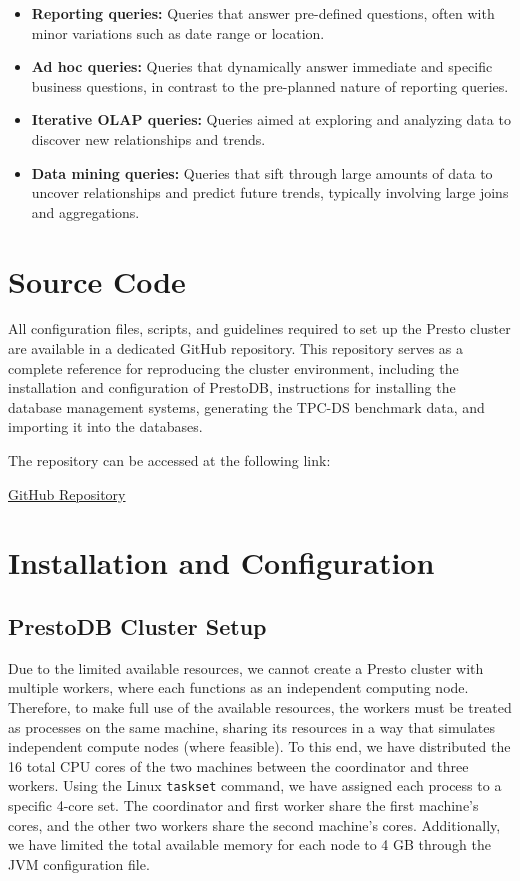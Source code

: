 \documentclass[conference]{IEEEtran}
\begin{document}
\begin{itemize}
    \item \textbf{Reporting queries:} Queries that answer pre-defined questions, often with minor variations such as date range or location.
    \item \textbf{Ad hoc queries:} Queries that dynamically answer immediate and specific business questions, in contrast to the pre-planned nature of reporting queries.
    \item \textbf{Iterative OLAP queries:} Queries aimed at exploring and analyzing data to discover new relationships and trends.
    \item \textbf{Data mining queries:} Queries that sift through large amounts of data to uncover relationships and predict future trends, typically involving large joins and aggregations. \cite{b5}
\end{itemize}

\section{Source Code}\label{source_code}

All configuration files, scripts, and guidelines required to set up the Presto cluster are available in a dedicated GitHub repository. This repository serves as a complete reference for reproducing the cluster environment, including the installation and configuration of PrestoDB, instructions for installing the database management systems, generating the TPC-DS benchmark data, and importing it into the databases.

The repository can be accessed at the following link:

\begin{center}
    \href{https://github.com/mpantelakis/ntua-info-systems}{GitHub Repository}
\end{center}


\section{Installation and Configuration}

\subsection{PrestoDB Cluster Setup}

Due to the limited available resources, we cannot create a Presto cluster with multiple workers, where each functions as an independent computing node. Therefore, to make full use of the available resources, the workers must be treated as processes on the same machine, sharing its resources in a way that simulates independent compute nodes (where feasible). To this end, we have distributed the 16 total CPU cores of the two machines between the coordinator and three workers. Using the Linux \texttt{taskset} command, we have assigned each process to a specific 4-core set. The coordinator and first worker share the first machine's cores, and the other two workers share the second machine's cores. Additionally, we have limited the total available memory for each node to 4 GB through the JVM configuration file.
\end{document}

